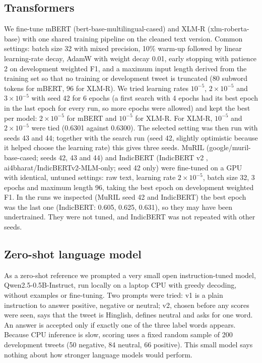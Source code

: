 \subsection{Transformers}
We fine-tune mBERT (bert-base-multilingual-cased) and XLM-R (xlm-roberta-base) with one shared training pipeline on the
cleaned text version. Common settings: batch size 32 with mixed precision, 10\% warm-up followed by linear learning-rate
decay, AdamW with weight decay 0.01, early stopping with patience 2 on development weighted F1, and a maximum input length
derived from the training set so that no training or development tweet is truncated (80 subword tokens for mBERT, 96 for
XLM-R). We tried learning rates $10^{-5}$, $2\times10^{-5}$ and $3\times10^{-5}$ with seed 42 for 6 epochs (a first search
with 4 epochs had its best epoch in the last epoch for every run, so more epochs were allowed) and kept the best per model:
$2\times10^{-5}$ for mBERT and $10^{-5}$ for XLM-R. For XLM-R, $10^{-5}$ and $2\times10^{-5}$ were tied (0.6301 against
0.6300). The selected setting was then run with seeds 43 and 44; together with the search run (seed 42, slightly optimistic
because it helped choose the learning rate) this gives three seeds. MuRIL (google/muril-base-cased; seeds 42, 43 and 44) and IndicBERT (IndicBERT v2 \cite{doddapaneni2023}, ai4bharat/IndicBERTv2-MLM-only; seed 42 only)
were fine-tuned on a GPU with identical, untuned settings: raw text, learning rate $2\times10^{-5}$, batch size 32, 3 epochs and
maximum length 96, taking the best epoch on development weighted F1. In the runs we inspected (MuRIL seed 42 and IndicBERT) the
best epoch was the last one (IndicBERT: 0.605, 0.625, 0.631), so they may have been undertrained. They were not tuned, and
IndicBERT was not repeated with other seeds.

\subsection{Zero-shot language model}
As a zero-shot reference we prompted a very small open instruction-tuned model, Qwen2.5-0.5B-Instruct, run locally on a
laptop CPU with greedy decoding, without examples or fine-tuning. Two prompts were tried: v1 is a plain instruction to
answer positive, negative or neutral; v2, chosen before any scores were seen, says that the tweet is Hinglish, defines
neutral and asks for one word. An answer is accepted only if exactly one of the three label words appears. Because CPU
inference is slow, scoring uses a fixed random sample of 200 development tweets (50 negative, 84 neutral, 66 positive).
This small model says nothing about how stronger language models would perform.

